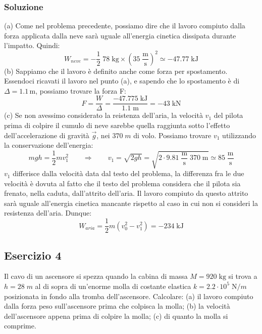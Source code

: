\documentclass[12pt,a4paper]{book}
\begin{document}
\subsubsection*{Soluzione}
(a) Come nel problema precedente, possiamo dire che il lavoro compiuto dalla forza applicata dalla neve sarà uguale all'energia cinetica dissipata durante l'impatto. Quindi:
\begin{equation*}
W_{neve}=-\frac{1}{2}\; 78\; \text{kg} \times \left (35\; \frac{\text{m}}{\text{s}}\right )^{2}\simeq  -47.77\; \text{kJ}
\end{equation*}
(b) Sappiamo che il lavoro è definito anche come forza per spostamento. Essendoci ricavati il lavoro nel punto (a), e sapendo che lo spostamento è di $\Delta=1.1 \,$m, possiamo trovare la forza F:
\begin{equation*}
F=\frac{W}{\Delta}=\frac{-47.775\; \text{kJ}}{1.1 \; \text{m}}=-43\;\text{kN}
\end{equation*}
(c) Se non avessimo considerato la reistenza dell'aria, la velocità $v_{1}$ del pilota prima di colpire il cumulo di neve sarebbe quella raggiunta sotto l'effetto dell'accelerazione di gravità $\vec{g}$, nei $370\;m$ di volo. Possiamo trovare $v_{1}$ utilizzando la conservazione dell'energia:
\begin{equation*}
mgh=\frac{1}{2}mv_{1}^{2} \qquad \Rightarrow \qquad v_{1}=\sqrt{2 g h}=\sqrt{2\cdot 9.81\;\frac{\text{m}}{\text{s}} \; 370\; \text{m} }\simeq 85 \; \frac{\text{m}}{\text{s}}
\end{equation*} 
$v_{1}$ differisce dalla velocità data dal testo del problema, la differenza fra le due velocità è dovuta al fatto che il testo del problema considera che il pilota sia frenato, nella caduta, dall'attrito dell'aria. Il lavoro compiuto da questo attrito sarà uguale all'energia cinetica mancante rispetto al caso in cui non si consideri la resistenza dell'aria. Dunque:
\begin{equation*}
W_{aria}= \frac{1}{2}m\left( v_{0}^{2}- v_{1}^{2} \right )= -234\; \text{kJ}
\end{equation*}


\subsection*{Esercizio 4}
Il cavo di un ascensore si spezza quando la cabina di massa $M=920 \;\text{kg}$ si trova a $h=28\; m$ al di sopra di un'enorme molla di costante elastica $k=2.2\cdot 10^{5}\; \text{N}/m$ posizionata in fondo alla tromba dell'ascensore. Calcolare: (a) il lavoro compiuto dalla forza peso sull'ascensore prima che colpisca la molla; (b) la velocità dell'ascensore appena prima di colpire la molla; (c) di quanto la molla si comprime.
\end{document}
